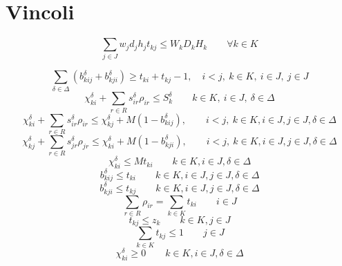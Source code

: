 \documentclass{scrartcl}
\begin{document}
\section{Vincoli}
\begin{equation}
\sum_{j \in J} w_j d_j h_j t_{kj} \leq W_kD_kH_k \quad\quad \forall k \in K 
\end{equation}

\begin{equation}
\sum_{\delta\in\Delta}(b_{kij}^\delta + b_{kji}^\delta) \geq t_{ki} + t_{kj} - 1, \quad i < j,\ k \in K,\ i \in J,\ j \in J
\end{equation}
\begin{equation}
\chi_{ki}^\delta + \sum_{r \in R} s_{ir}^\delta \rho_{ir} \leq S_k^\delta \quad \quad k \in K,\ i \in J,\ \delta \in \Delta
\end{equation}
\begin{equation}
\chi_{ki}^\delta + \sum_{r \in R} s_{ir}^\delta \rho_{ir} \leq \chi_{kj}^\delta + M(1 - b_{kij}^\delta), \quad \quad i < j,\ k \in K, i \in J, j \in J, \delta \in \Delta
\end{equation}
\begin{equation}
\chi_{kj}^\delta + \sum_{r \in R} s_{jr}^\delta \rho_{jr} \leq \chi_{ki}^\delta + M(1 - b_{kji}^\delta), \quad \quad i < j,\ k \in K, i \in J, j \in J, \delta \in \Delta
\end{equation}
\begin{equation}
\chi_{ki}^\delta \leq M t_{ki}\quad\quad k \in K, i \in J, \delta \in \Delta
\end{equation}
\begin{equation}
b_{kij}^\delta \leq t_{ki}\quad \quad k \in K, i \in J, j \in J, \delta \in \Delta
\end{equation}
\begin{equation}
b_{kji}^\delta \leq t_{kj} \quad \quad k \in K, i \in J, j \in J, \delta \in \Delta
\end{equation}
\begin{equation}
\sum_{r \in R} \rho_{ir} = \sum_{k \in K} t_{ki}\quad \quad i \in J
\end{equation}
\begin{equation}
\label{constraint:multi:tkzk}
t_{kj} \leq z_k\quad \quad k \in K, j \in J
\end{equation}
\begin{equation}
\label{constraint:multi:onlyInOneKnapsack}
\sum_{k \in K} t_{kj} \leq 1 \quad \quad j \in J
\end{equation}
\begin{equation}
\chi_{ki}^\delta \geq 0 \quad \quad k \in K, i \in J, \delta \in \Delta
\end{equation}
\end{document}
